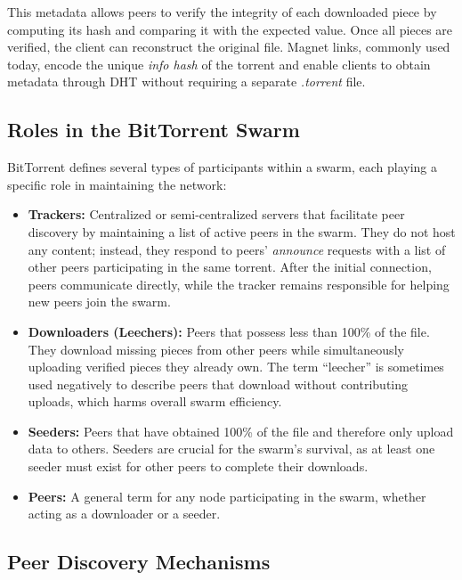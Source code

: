 This metadata allows peers to verify the integrity of each downloaded piece by computing its hash and comparing it with the expected value. Once all pieces are verified, the client can reconstruct the original file. Magnet links, commonly used today, encode the unique \textit{info hash} of the torrent and enable clients to obtain metadata through DHT without requiring a separate \textit{.torrent} file.

\subsection{Roles in the BitTorrent Swarm}
\label{bittorrent_roles}

BitTorrent defines several types of participants within a swarm, each playing a specific role in maintaining the network:

\begin{itemize}
  \item \textbf{Trackers:} Centralized or semi-centralized servers that facilitate peer discovery by maintaining a list of active peers in the swarm. They do not host any content; instead, they respond to peers’ \textit{announce} requests with a list of other peers participating in the same torrent. After the initial connection, peers communicate directly, while the tracker remains responsible for helping new peers join the swarm.

  \item \textbf{Downloaders (Leechers):} Peers that possess less than 100\% of the file. They download missing pieces from other peers while simultaneously uploading verified pieces they already own. The term “leecher” is sometimes used negatively to describe peers that download without contributing uploads, which harms overall swarm efficiency.

  \item \textbf{Seeders:} Peers that have obtained 100\% of the file and therefore only upload data to others. Seeders are crucial for the swarm’s survival, as at least one seeder must exist for other peers to complete their downloads.

  \item \textbf{Peers:} A general term for any node participating in the swarm, whether acting as a downloader or a seeder.
\end{itemize}

\subsection{Peer Discovery Mechanisms}
\label{peer_discovery}

